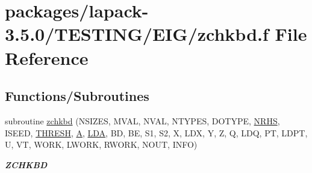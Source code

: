 \hypertarget{zchkbd_8f}{}\section{packages/lapack-\/3.5.0/\+T\+E\+S\+T\+I\+N\+G/\+E\+I\+G/zchkbd.f File Reference}
\label{zchkbd_8f}
\subsection*{Functions/\+Subroutines}
\begin{DoxyCompactItemize}
\item 
subroutine \hyperlink{group__complex16__eig_gae8a8aba29ee582b9b36f60338693a761}{zchkbd} (N\+S\+I\+Z\+E\+S, M\+V\+A\+L, N\+V\+A\+L, N\+T\+Y\+P\+E\+S, D\+O\+T\+Y\+P\+E, \hyperlink{example__user_8c_aa0138da002ce2a90360df2f521eb3198}{N\+R\+H\+S}, I\+S\+E\+E\+D, \hyperlink{zlaqgs_8c_a0656018abfc9fa2821827415f5d5ea57}{T\+H\+R\+E\+S\+H}, \hyperlink{classA}{A}, \hyperlink{example__user_8c_ae946da542ce0db94dced19b2ecefd1aa}{L\+D\+A}, B\+D, B\+E, S1, S2, X, L\+D\+X, Y, Z, Q, L\+D\+Q, P\+T, L\+D\+P\+T, U, V\+T, W\+O\+R\+K, L\+W\+O\+R\+K, R\+W\+O\+R\+K, N\+O\+U\+T, I\+N\+F\+O)
\begin{DoxyCompactList}\small\item\em {\bfseries Z\+C\+H\+K\+B\+D} \end{DoxyCompactList}\end{DoxyCompactItemize}
